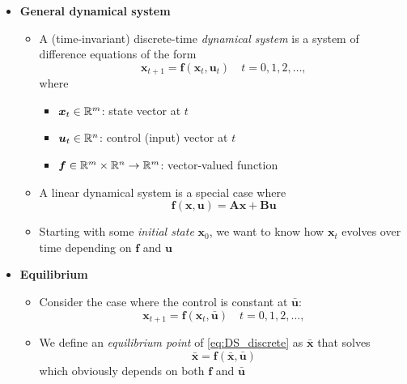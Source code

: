 \documentclass[12pt,a4paper]{article}
\begin{document}
\begin{itemize}

\item \textbf{General dynamical system}
  \begin{itemize}
  \item A (time-invariant) discrete-time \emph{dynamical system} is a system of difference equations of the form
    \begin{equation}\nonumber%
      \bm{x}_{t+1} = \bm{f}(\bm{x}_{t},\bm{u}_{t})
      \quad t = 0, 1, 2, \ldots,
    \end{equation}
    where
    \begin{itemize}
    \item $\bm{x}_{t}\in \mathbb{R}^{m}$: state vector at $t$
    \item $\bm{u}_{t}\in \mathbb{R}^{n}$: control (input) vector at $t$
    \item $\bm{f} \in \mathbb{R}^{m}\times \mathbb{R}^{n} \to \mathbb{R}^{m}$: vector-valued function
    \end{itemize}
  \item A linear dynamical system is a special case where
    \begin{equation}\nonumber%
      \bm{f}(\bm{x},\bm{u}) = \bm{A}\bm{x} + \bm{B}\bm{u}
    \end{equation}
  \item Starting with some \emph{initial state} $\bm{x}_{0}$,
    we want to know how $\bm{x}_{t}$ evolves over time depending on $\bm{f}$ and $\bm{u}$
  \end{itemize}

\item \textbf{Equilibrium}
  \begin{itemize}
  \item Consider the case where the control is constant at $\bar{\bm{u}}$:
    \begin{equation}\label{eq:DS_discrete}%
      \bm{x}_{t+1} = \bm{f}(\bm{x}_{t},\bar{\bm{u}})
      \quad t = 0, 1, 2, \ldots,
    \end{equation}
  \item We define an \emph{equilibrium point} of \eqref{eq:DS_discrete} as $\bar{\bm{x}}$ that solves
    \begin{equation}\nonumber%
      \bar{\bm{x}} = \bm{f}(\bar{\bm{x}},\bar{\bm{u}})
    \end{equation}
    which obviously depends on both $\bm{f}$ and $\bar{\bm{u}}$
  \end{itemize}


\end{itemize}
\end{document}
